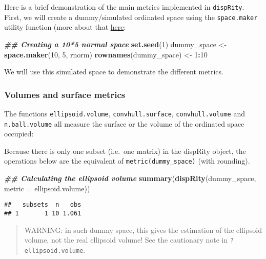 \documentclass[
]{book}
\newenvironment{Shaded}{\begin{snugshade}}{\end{snugshade}}
\newcommand{\AttributeTok}[1]{\textcolor[rgb]{0.13,0.29,0.53}{#1}}
\newcommand{\DecValTok}[1]{\textcolor[rgb]{0.00,0.00,0.81}{#1}}
\newcommand{\DocumentationTok}[1]{\textcolor[rgb]{0.56,0.35,0.01}{\textbf{\textit{#1}}}}
\newcommand{\FunctionTok}[1]{\textcolor[rgb]{0.13,0.29,0.53}{\textbf{#1}}}
\newcommand{\NormalTok}[1]{#1}
\newcommand{\OtherTok}[1]{\textcolor[rgb]{0.56,0.35,0.01}{#1}}
\newcommand{\SpecialCharTok}[1]{\textcolor[rgb]{0.81,0.36,0.00}{\textbf{#1}}}
\begin{document}
Here is a brief demonstration of the main metrics implemented in \texttt{dispRity}.
First, we will create a dummy/simulated ordinated space using the \texttt{space.maker} utility function (more about that \protect\hyperlink{space.maker}{here}:

\begin{Shaded}
\begin{Highlighting}[]
\DocumentationTok{\#\# Creating a 10*5 normal space}
\FunctionTok{set.seed}\NormalTok{(}\DecValTok{1}\NormalTok{)}
\NormalTok{dummy\_space }\OtherTok{\textless{}{-}} \FunctionTok{space.maker}\NormalTok{(}\DecValTok{10}\NormalTok{, }\DecValTok{5}\NormalTok{, rnorm)}
\FunctionTok{rownames}\NormalTok{(dummy\_space) }\OtherTok{\textless{}{-}} \DecValTok{1}\SpecialCharTok{:}\DecValTok{10}
\end{Highlighting}
\end{Shaded}

We will use this simulated space to demonstrate the different metrics.

\hypertarget{volumes-and-surface-metrics}{%
\subsubsection{Volumes and surface metrics}\label{volumes-and-surface-metrics}}

The functions \texttt{ellipsoid.volume}, \texttt{convhull.surface}, \texttt{convhull.volume} and \texttt{n.ball.volume} all measure the surface or the volume of the ordinated space occupied:

Because there is only one subset (i.e.~one matrix) in the dispRity object, the operations below are the equivalent of \texttt{metric(dummy\_space)} (with rounding).

\begin{Shaded}
\begin{Highlighting}[]
\DocumentationTok{\#\# Calculating the ellipsoid volume}
\FunctionTok{summary}\NormalTok{(}\FunctionTok{dispRity}\NormalTok{(dummy\_space, }\AttributeTok{metric =}\NormalTok{ ellipsoid.volume))}
\end{Highlighting}
\end{Shaded}

\begin{verbatim}
##   subsets  n   obs
## 1       1 10 1.061
\end{verbatim}

\begin{quote}
WARNING: in such dummy space, this gives the estimation of the ellipsoid volume, not the real ellipsoid volume! See the cautionary note in \texttt{?ellipsoid.volume}.
\end{quote}
\end{document}
